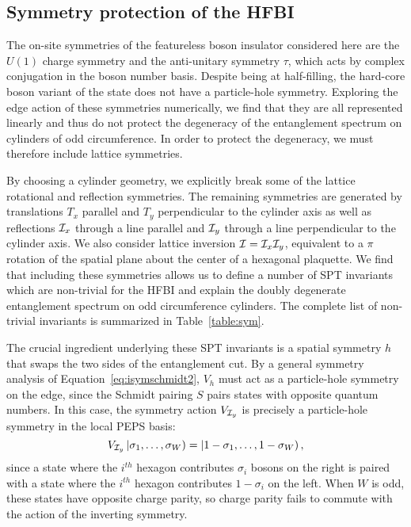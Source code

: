 \subsection{Symmetry protection of the HFBI}

The on-site symmetries of the featureless boson insulator considered here
are the $U(1)$ charge symmetry and the 
anti-unitary symmetry $\tau$, which acts by complex conjugation in the boson number basis.
Despite being at half-filling, the hard-core boson variant of the state does not have a particle-hole
symmetry. Exploring the edge action of these symmetries numerically, we find that they are all
represented linearly and thus do not protect the degeneracy of the entanglement spectrum
on cylinders of odd circumference.
In order to protect the degeneracy, we must therefore include lattice symmetries.

By choosing a cylinder geometry, we explicitly break some of the lattice rotational
and reflection symmetries. The remaining symmetries are generated by
translations $T_x$ parallel and $T_y$ perpendicular to the cylinder axis
as well as reflections $\mathcal{I}_x$ through a line parallel and $\mathcal{I}_y$ through a line perpendicular to 
the cylinder axis. We also consider lattice inversion $\mathcal{I} = \mathcal{I}_x \mathcal{I}_y$, equivalent to a $\pi$ 
rotation of the spatial plane about the center of a hexagonal plaquette. We find that including
these symmetries allows us to define a number of SPT invariants which are non-trivial
for the HFBI and explain the doubly degenerate entanglement spectrum on odd circumference 
cylinders. The complete list of non-trivial invariants is summarized in Table~\ref{table:sym}. 

The crucial ingredient underlying these SPT invariants is a spatial symmetry $h$ that swaps the 
two sides of the entanglement cut. 
By a general symmetry analysis of Equation~\ref{eq:isymschmidt2}, $V_h$ must act as a 
particle-hole symmetry on the edge, since the Schmidt pairing $S$ pairs states with
opposite quantum numbers. In this case, the symmetry action $V_{\mathcal{I}_y}$ is precisely
a particle-hole symmetry in the local PEPS basis:
$$
V_{\mathcal{I}_y}\left |\sigma_1, \ldots, \sigma_{W} \right ) = \left |1-\sigma_1, \ldots, 1-\sigma_{W} \right ), 
$$
since a state where the $i^{th}$ hexagon contributes $\sigma_i$ bosons on the right is paired with
a state where the $i^{th}$ hexagon contributes $1-\sigma_i$ on the left.
When $W$ is odd, these states have opposite charge parity, so charge parity fails to commute with
the action of the inverting symmetry.

